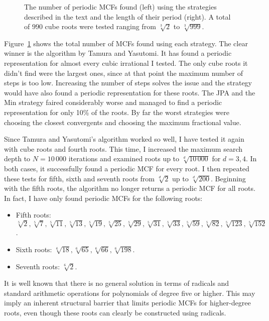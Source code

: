 \begin{figure}[tbp]
  \centering
  
  \caption{
    The number of periodic MCFs found (left) using the strategies described in the
    text and the length of their period (right).
    A total of $990$ cube roots were tested ranging from $\sqrt[3]{2}$ to $\sqrt[3]{999}$.
  }
  \label{fig:comparison}
\end{figure}

Figure~\ref{fig:comparison} shows the total number of MCFs found using each strategy.
The clear winner is the algorithm by Tamura and Yasutomi.
It has found a periodic representation for almost every cubic irrational I tested.
The only cube roots it didn't find were the largest ones,
since at that point the maximum number of steps is too low.
Increasing the number of steps solves the issue and the strategy would have
also found a periodic representation for these roots.
The JPA and the Min strategy faired considerably worse and managed to find a
periodic representation for only 10\% of the roots.
By far the worst strategies were choosing the closest convergents and choosing
the maximum fractional value.

Since Tamura and Yasutomi's algorithm worked so well,
I have tested it again with cube roots and fourth roots.
This time, I increased the maximum search depth to $N = 10\,000$ iterations
and examined roots up to $\sqrt[d]{10\,000}$ for $d=3,4$.
In both cases, it successfully found a periodic MCF for every root.
I then repeated these tests for fifth, sixth and seventh roots
from $\sqrt[d]{2}$ up to $\sqrt[d]{200}$.
Beginning with the fifth roots, the algorithm no longer returns a periodic MCF for all roots.
In fact, I have only found periodic MCFs for the following roots:
\begin{itemize}
  \item Fifth roots:
    $\sqrt[5]{2}, \sqrt[5]{7}, \sqrt[5]{11}, \sqrt[5]{13}, \sqrt[5]{19},
    \sqrt[5]{25}, \sqrt[5]{29}, \sqrt[5]{31}, \sqrt[5]{33}, \sqrt[5]{59},
    \sqrt[5]{82}, \sqrt[5]{123}, \sqrt[5]{152}$.
  \item Sixth roots: $\sqrt[6]{18}, \sqrt[6]{65}, \sqrt[6]{66},\sqrt[6]{198}$.
  \item Seventh roots: $\sqrt[6]{2}$.
\end{itemize}
It is well known that there is no general solution in terms of radicals and
standard arithmetic operations for polynomials of degree five or higher.
This may imply an inherent structural barrier that limits periodic MCFs for
higher-degree roots, even though these roots can clearly be constructed using
radicals.

